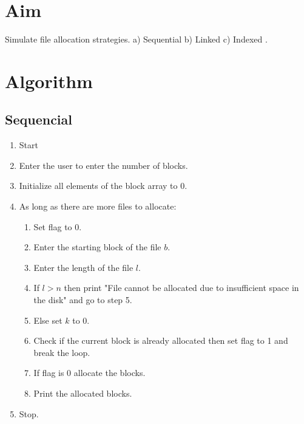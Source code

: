 
\section{Aim}
Simulate file allocation strategies. a) Sequential b) Linked c) Indexed .

\section{Algorithm}

\subsection{Sequencial}
\begin{enumerate}[label=\arabic*.]
    \item Start
    \item Enter the user to enter the number of blocks.
    \item Initialize all elements of the block array to 0.
    \item As long as there are more files to allocate:
    \begin{enumerate}[label=4.\arabic*.]
        \item Set flag to 0.
        \item Enter the starting block of the file $b$.
        \item Enter the length of the file $l$.
        \item If $l > n$ then print "File cannot be allocated due to insufficient space in the disk" and go to step 5.
        \item Else set $k$ to 0.
        \item Check if the current block is already allocated then set flag to 1 and break the loop.
        \item If flag is 0 allocate the blocks.
        \item Print the allocated blocks.
    \end{enumerate}
    \item Stop.
\end{enumerate}

